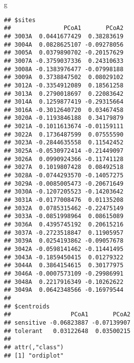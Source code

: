 \documentclass[
]{article}
\newenvironment{Shaded}{\begin{snugshade}}{\end{snugshade}}
\newcommand{\FloatTok}[1]{\textcolor[rgb]{0.00,0.00,0.81}{#1}}
\newcommand{\FunctionTok}[1]{\textcolor[rgb]{0.00,0.00,0.00}{#1}}
\newcommand{\NormalTok}[1]{#1}
\newcommand{\OtherTok}[1]{\textcolor[rgb]{0.56,0.35,0.01}{#1}}
\newcommand{\SpecialCharTok}[1]{\textcolor[rgb]{0.00,0.00,0.00}{#1}}
\newcommand{\StringTok}[1]{\textcolor[rgb]{0.31,0.60,0.02}{#1}}
\begin{document}
\begin{Shaded}
\begin{Highlighting}[]
\NormalTok{g}
\end{Highlighting}
\end{Shaded}

\begin{verbatim}
## $sites
##               PCoA1       PCoA2
## 3003A  0.0441677429  0.38283619
## 3004A  0.0828625107 -0.09278056
## 3005A  0.0379890702 -0.20157629
## 3007A -0.3759037336  0.24310633
## 3008A -0.1383976477 -0.07998188
## 3009A  0.3738847502  0.08029102
## 3012A -0.3354912089  0.18561258
## 3013A  0.2790018697  0.22083642
## 3014A  0.1259877419 -0.29315664
## 3016A -0.3012640720  0.03467458
## 3020A -0.1193846188  0.34179879
## 3021A -0.1011613674 -0.01159111
## 3022A  0.1736487599  0.07555590
## 3023A -0.2844635558  0.11542452
## 3025A -0.0530972414 -0.21449097
## 3026A  0.0990924366 -0.11741128
## 3027A  0.1019807428  0.08492518
## 3028A -0.0744293570 -0.14057275
## 3029A -0.0085005473 -0.20671649
## 3030A -0.1207205523 -0.14203642
## 3031A -0.0177008476  0.01135208
## 3032A  0.0785315462 -0.22475149
## 3033A -0.0851998964  0.08615089
## 3036A  0.4395745192  0.20615216
## 3037A -0.2723518847  0.11905957
## 3039A  0.0254193862 -0.09057678
## 3042A -0.0598141462 -0.11441495
## 3043A -0.1859450415  0.01279322
## 3044A  0.3864154615  0.30177975
## 3046A -0.0007573109 -0.29986991
## 3048A  0.2217916349 -0.10262622
## 3049A  0.0642348566 -0.16979544
## 
## $centroids
##                 PCoA1       PCoA2
## sensitive -0.06823887 -0.07139907
## tolerant   0.03122648  0.03500215
## 
## attr(,"class")
## [1] "ordiplot"
\end{verbatim}

\begin{Shaded}
\end{Shaded}
\end{document}
